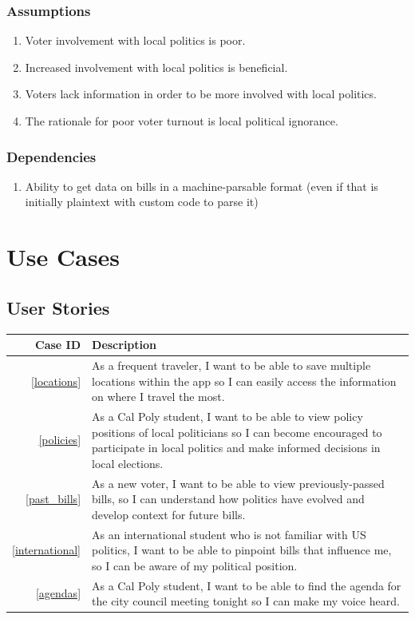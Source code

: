 \documentclass[12pt,oneside,letterpaper]{article}
\begin{document}
\subsubsection{Assumptions}
\begin{enumerate}
\item Voter involvement with local politics is poor.
\item Increased involvement with local politics is beneficial.
\item Voters lack information in order to be more involved with local politics.
\item The rationale for poor voter turnout is local political ignorance.
\end{enumerate}

\subsubsection{Dependencies}
\begin{enumerate}
\item Ability to get data on bills in a machine-parsable format (even if that is initially plaintext with custom code to parse it)
\end{enumerate}

\section{Use Cases}
\subsection{User Stories}
\begin{longtabu}{|r|X|}
  \hline
  Case ID & Description \\
  \hline
  \cref{locations} & As a frequent traveler, I want to be able to save
  multiple locations within the app so I can easily access the
  information on where I travel the most. \\
  \hline
  \cref{policies} & As a Cal Poly student, I want to be able to view
  policy positions of local politicians so I can become encouraged to
  participate in local politics and make informed decisions in local
  elections. \\
  \hline
  \cref{past_bills} & As a new voter, I want to be able to view
  previously-passed bills, so I can understand how politics have evolved
  and develop context for future bills. \\
  \hline
  \cref{international} & As an international student who is not
  familiar with US politics, I want to be able to pinpoint bills that
  influence me, so I can be aware of my political position.\\
  \hline
  \cref{agendas} & As a Cal Poly student, I want to be able to
  find the agenda for the city council meeting
  tonight so I can make my voice heard. \\
  \hline
\end{longtabu}
\end{document}
